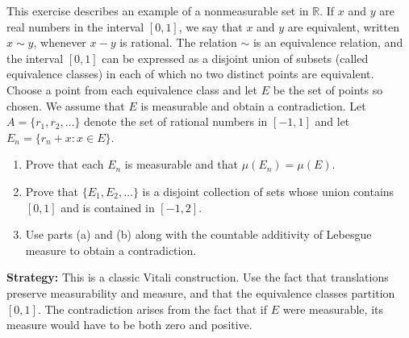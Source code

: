 \begin{problembox}
This exercise describes an example of a nonmeasurable set in $\mathbb{R}$. If $x$ and $y$ are real numbers in the interval $[0, 1]$, we say that $x$ and $y$ are equivalent, written $x \sim y$, whenever $x - y$ is rational. The relation $\sim$ is an equivalence relation, and the interval $[0, 1]$ can be expressed as a disjoint union of subsets (called equivalence classes) in each of which no two distinct points are equivalent. Choose a point from each equivalence class and let $E$ be the set of points so chosen. We assume that $E$ is measurable and obtain a contradiction. Let $A = \{r_1, r_2, \ldots \}$ denote the set of rational numbers in $[-1, 1]$ and let $E_n = \{r_n + x : x \in E\}$.
\begin{enumerate}[label=(\alph*)]
\item Prove that each $E_n$ is measurable and that $\mu(E_n) = \mu(E)$.
\item Prove that $\{E_1, E_2, \ldots \}$ is a disjoint collection of sets whose union contains $[0, 1]$ and is contained in $[-1, 2]$.
\item Use parts (a) and (b) along with the countable additivity of Lebesgue measure to obtain a contradiction.
\end{enumerate}
\end{problembox}

\noindent\textbf{Strategy:} This is a classic Vitali construction. Use the fact that translations preserve measurability and measure, and that the equivalence classes partition $[0,1]$. The contradiction arises from the fact that if $E$ were measurable, its measure would have to be both zero and positive.

